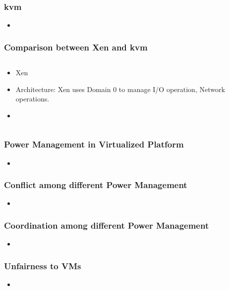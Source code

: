 \documentclass{beamer}
\begin{document}
\begin{frame} 
\frametitle{kvm}
\begin{itemize}
\item 
\end{itemize}
\end{frame}
\begin{frame}
\frametitle{Comparison between Xen and kvm}
\begin{columns}
\begin{column}{0.5\textwidth}
\begin{itemize}
\item Xen
\item Architecture: Xen uses Domain 0 to manage I/O operation, Network operations.
\item 
\end{itemize}
\end{column}
\end{columns}
\end{frame}
\begin{frame}
\frametitle{Power Management in Virtualized Platform}
\begin{itemize}
\item 
\end{itemize}
\end{frame}


\begin{frame}
\frametitle{Conflict among different Power Management}
\begin{itemize}
\item 
\end{itemize}
\end{frame}

\begin{frame}
\frametitle{Coordination among different Power Management}
\begin{itemize}
\item 
\end{itemize}
\end{frame}

\begin{frame}
\frametitle{Unfairness to VMs}
\begin{itemize}
\item 
\end{itemize}
\end{frame}
\end{document}
